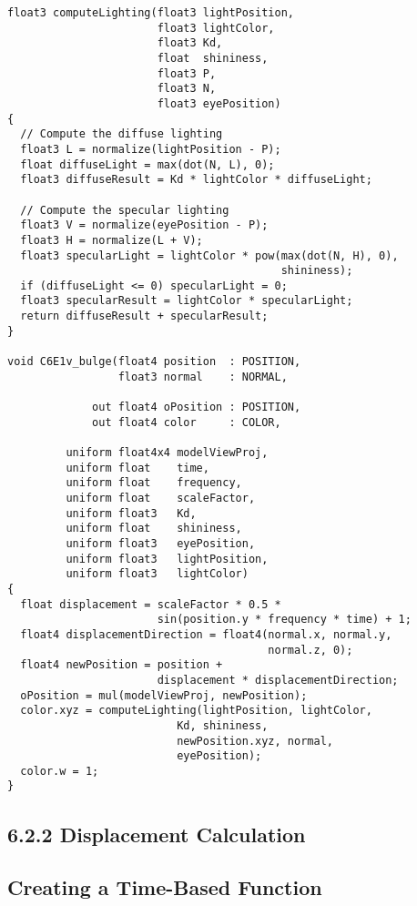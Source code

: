 \documentclass[../main.tex]{subfiles}
\begin{document}
\FloatBarrier
\begin{lstlisting}[caption=Example 6-1. The \textbf{C6E1v_bulge} Vertex Program]
float3 computeLighting(float3 lightPosition,
                       float3 lightColor,
                       float3 Kd,
                       float  shininess,
                       float3 P,
                       float3 N,
                       float3 eyePosition)
{
  // Compute the diffuse lighting
  float3 L = normalize(lightPosition - P);
  float diffuseLight = max(dot(N, L), 0);
  float3 diffuseResult = Kd * lightColor * diffuseLight;

  // Compute the specular lighting
  float3 V = normalize(eyePosition - P);
  float3 H = normalize(L + V);
  float3 specularLight = lightColor * pow(max(dot(N, H), 0),
                                          shininess);
  if (diffuseLight <= 0) specularLight = 0;
  float3 specularResult = lightColor * specularLight;
  return diffuseResult + specularResult;
}

void C6E1v_bulge(float4 position  : POSITION,
                 float3 normal    : NORMAL,

             out float4 oPosition : POSITION,
             out float4 color     : COLOR,

         uniform float4x4 modelViewProj,
         uniform float    time,
         uniform float    frequency,
         uniform float    scaleFactor,
         uniform float3   Kd,
         uniform float    shininess,
         uniform float3   eyePosition,
         uniform float3   lightPosition,
         uniform float3   lightColor)
{
  float displacement = scaleFactor * 0.5 *
                       sin(position.y * frequency * time) + 1;
  float4 displacementDirection = float4(normal.x, normal.y,
                                        normal.z, 0);
  float4 newPosition = position +
                       displacement * displacementDirection;
  oPosition = mul(modelViewProj, newPosition);
  color.xyz = computeLighting(lightPosition, lightColor,
                          Kd, shininess,
                          newPosition.xyz, normal,
                          eyePosition);
  color.w = 1;
}
\end{lstlisting}
\FloatBarrier

\subsection{6.2.2 Displacement Calculation}

\subsection*{Creating a Time-Based Function}
\end{document}
